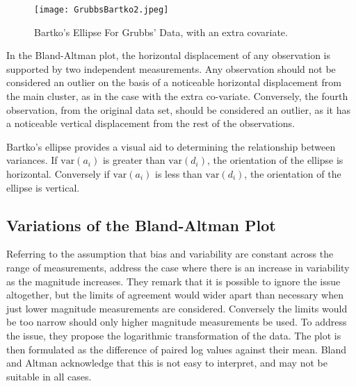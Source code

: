 \documentclass[12pt, a4paper]{report}
\begin{document}
\begin{figure}[h!]
  \texttt{[image: GrubbsBartko2.jpeg]}
  \caption{Bartko's Ellipse For Grubbs' Data, with an extra covariate.}\label{GrubbsBartko2}
\end{figure}

In the Bland-Altman plot, the horizontal displacement of any
observation is supported by two independent measurements. Any
observation should not be considered an outlier on the basis of a
noticeable horizontal displacement from the main cluster, as in
the case with the extra co-variate. Conversely, the fourth
observation, from the original data set, should be considered an
outlier, as it has a noticeable vertical displacement from the
rest of the observations.

Bartko's ellipse provides a visual aid to determining the
relationship between variances. If $\mbox{var}(a_{i})$ is greater
than $\mbox{var}(d_{i})$, the orientation of the ellipse is
horizontal. Conversely if $\mbox{var}(a_{i})$ is less than
$\mbox{var}(d_{i})$, the orientation of the ellipse is vertical.
\newpage




\subsection{Variations of the Bland-Altman Plot} Referring to the
assumption that bias and variability are constant across the range
of measurements, \citet{BA99} address the case where there is an
increase in variability as the magnitude increases. They remark
that it is possible to ignore the issue altogether, but the limits
of agreement would wider apart than necessary when just lower
magnitude measurements are considered. Conversely the limits would
be too narrow should only higher magnitude measurements be used.
To address the issue, they propose the logarithmic transformation
of the data. The plot is then formulated as the difference of
paired log values against their mean. Bland and Altman acknowledge
that this is not easy to interpret, and may not be suitable in
all cases.
\end{document}
